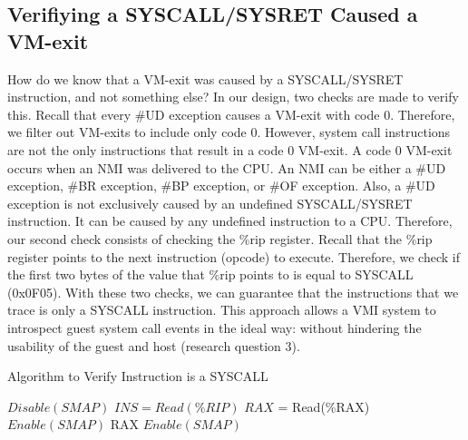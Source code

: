 \documentclass{report}
\begin{document}
\begin{spacing}{1.5}
\subsection{Verifiying a SYSCALL/SYSRET Caused a VM-exit}
{\large
How do we know that a VM-exit was caused by a SYSCALL/SYSRET instruction, and not something else? In our design, two checks are made to verify this. Recall that every \#UD exception causes a VM-exit with code 0. Therefore, we filter out VM-exits to include only code 0. However, system call instructions are not the only instructions that result in a code 0 VM-exit. A code 0 VM-exit occurs when an NMI was delivered to the CPU. An NMI can be either a \#UD exception, \#BR exception, \#BP exception, or \#OF exception. Also, a \#UD exception is not exclusively caused by an undefined SYSCALL/SYSRET instruction. It can be caused by any undefined instruction to a CPU. Therefore, our second check consists of checking the \%rip register. Recall that the \%rip register points to the next instruction (opcode) to execute. Therefore, we check if the first two bytes of the value that \%rip points to is equal to SYSCALL (0x0F05). With these two checks, we can guarantee that the instructions that we trace is only a SYSCALL instruction. This approach allows a VMI system to introspect guest system call events in the ideal way: without hindering the usability of the guest and host (research question 3).
\leavevmode\newline
}


\begin{algorithm} \caption{Algorithm to Verify Instruction is a SYSCALL}
\begin{algorithmic}[1]
\State    $Disable(SMAP)$
\State    $INS = Read(\%RIP)$
\State    $RAX$ = Read(\%RAX)
\State    $Enable(SMAP)$
\State    \Return RAX
\EndIf
\State    $Enable(SMAP)$
\EndIf
\end{algorithmic}
\end{algorithm}



\end{spacing}
\end{document}

